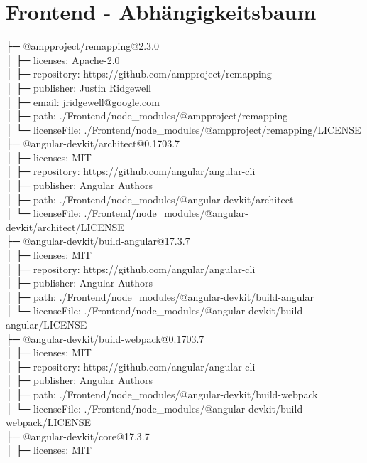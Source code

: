 \section{Frontend - Abhängigkeitsbaum}\label{sec:frontend---abhangigkeitsbaum}
├─ @ampproject/remapping@2.3.0\\
│  ├─ licenses: Apache-2.0\\
│  ├─ repository: https://github.com/ampproject/remapping\\
│  ├─ publisher: Justin Ridgewell\\
│  ├─ email: jridgewell@google.com\\
│  ├─ path: ./Frontend/node\_modules/@ampproject/remapping\\
│  └─ licenseFile: ./Frontend/node\_modules/@ampproject/remapping/LICENSE\\
├─ @angular-devkit/architect@0.1703.7\\
│  ├─ licenses: MIT\\
│  ├─ repository: https://github.com/angular/angular-cli\\
│  ├─ publisher: Angular Authors\\
│  ├─ path: ./Frontend/node\_modules/@angular-devkit/architect\\
│  └─ licenseFile: ./Frontend/node\_modules/@angular-devkit/architect/LICENSE\\
├─ @angular-devkit/build-angular@17.3.7\\
│  ├─ licenses: MIT\\
│  ├─ repository: https://github.com/angular/angular-cli\\
│  ├─ publisher: Angular Authors\\
│  ├─ path: ./Frontend/node\_modules/@angular-devkit/build-angular\\
│  └─ licenseFile: ./Frontend/node\_modules/@angular-devkit/build-angular/LICENSE\\
├─ @angular-devkit/build-webpack@0.1703.7\\
│  ├─ licenses: MIT\\
│  ├─ repository: https://github.com/angular/angular-cli\\
│  ├─ publisher: Angular Authors\\
│  ├─ path: ./Frontend/node\_modules/@angular-devkit/build-webpack\\
│  └─ licenseFile: ./Frontend/node\_modules/@angular-devkit/build-webpack/LICENSE\\
├─ @angular-devkit/core@17.3.7\\
│  ├─ licenses: MIT\\
